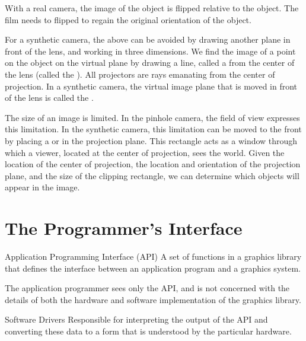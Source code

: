 \documentclass[../COS3712_Notes.tex]{subfiles}
\begin{document}
      With a real camera, the image of the object is flipped relative to the object.
      The film needs to flipped to regain the original orientation of the object.

      For a synthetic camera, the above can be avoided by
      drawing another plane in front of the lens, and
      working in three dimensions.
      We find the image of a point on the object on the virtual plane
      by drawing a line, called a 
      from the center of the lens (called the ).
      All projectors are rays emanating from the center of projection.
      In a synthetic camera, the virtual image plane that is moved in front of the lens
      is called the .

      The size of an image is limited.
      In the pinhole camera, the field of view expresses this limitation.
      In the synthetic camera, this limitation can be moved to the front by
      placing a  or 
      in the projection plane.
      This rectangle acts as a window through which a viewer,
      located at the center of projection,
      sees the world.
      Given the location of the center of projection,
      the location and orientation of the projection plane, and
      the size of the clipping rectangle,
      we can determine which objects will appear in the image.

    \pagebreak

    \section{The Programmer's Interface}
      \begin{definition}{Application Programming Interface (API)}
        A set of functions in a graphics library that defines the interface
        between an application program and a graphics system.
      \end{definition}

      The application programmer sees only the API,
      and is not concerned with the details of both the hardware and software implementation
      of the graphics library.

      \begin{definition}{Software Drivers}
        Responsible for interpreting the output of the API
        and converting these data to a form that is understood by the particular hardware.
      \end{definition}
\end{document}
